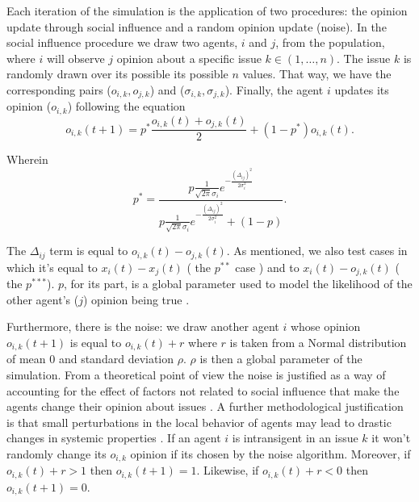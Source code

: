 \documentclass{article}
\begin{document}
Each iteration of the simulation is the application of two procedures: the
opinion update through social influence and a random opinion update (noise). In
the social influence procedure we draw two agents, \(i\) and \(j\), from the
population, where \(i\) will observe \(j\) opinion about a specific issue \(k
\in (1 , \ldots, n)\). The issue $k$ is randomly drawn over its possible its
possible $n$ values. That way, we have the corresponding pairs (\(o_{i,k},
o_{j,k}\)) and (\(\sigma_{i,k}, \sigma_{j,k}\)). Finally, the agent \(i\)
updates its opinion (\(o_{i,k}\)) following the equation
  \[
    o_{i,k}(t+1) =
    p^{*}
    \frac{o_{i,k}(t) + o_{j,k}(t) }{2}
    +
    (1 - p^{*})
    o_{i,k}(t).
  \]

  Wherein 
  \[
   p^{*}
    =
  \frac{
      p \frac{1}{\sqrt{2 \pi} \sigma_i}
      e^{- \frac{ (\Delta_{ij})^2}{2 \sigma_i^2}}
    }{
      p
      \frac{1}{\sqrt{2 \pi} \sigma_i}
    e^{- \frac{ ( \Delta_{ij})^2}{2 \sigma_i^2}}
    +
    (1 - p)
  }.
\]



The \(\Delta_{ij} \) term is equal to \( o_{i,k} (t) - o_{j,k} (t)\). As
mentioned, we also test cases in which it's equal to \( x_i(t) - x_j(t) \) ( the
\(p^{**}\) case ) and to \(x_{i}(t) - o_{j,k}(t)\) ( the \(p^{***}\)). \(p\),
for its part, is a global parameter used to model the likelihood of the other
agent's (\(j\)) opinion being true \cite{martins12b}.

Furthermore, there is the noise: we draw another agent \(i\) whose opinion \(
o_{i,k}(t+1)\) is equal to \(o_{i,k}(t) + r\) where \(r\) is taken from a Normal
distribution of mean 0 and standard deviation \(\rho\). \(\rho\) is then a
global parameter of the simulation. From a theoretical point of view the noise
is justified as a way of accounting for the effect of factors not related to
social influence that make the agents change their opinion about issues
\cite{flache2017}. A further methodological justification is that small
perturbations in the local behavior of agents may lead to drastic changes in
systemic properties \cite{macy2015signal}. If an agent \(i\) is intransigent in
an issue \(k\) it won't randomly change its \(o_{i,k}\) opinion if its chosen by
the noise algorithm. Moreover, if \(o_{i,k}(t) + r > 1\) then \( o_{i,k}(t+1) =
1\). Likewise, if \(o_{i,k}(t) + r < 0 \) then \( o_{i,k}(t+1) = 0\).
\end{document}
